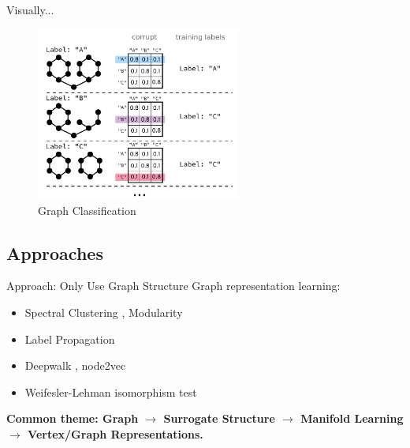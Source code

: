 \documentclass{beamer}
\begin{document}
    \begin{frame}{Visually...}
        \begin{figure}
            \centering
            \includegraphics[width=0.6\textwidth]{imgs/scheme}
            \caption{Graph Classification~\cite{my_lld2019}}
            \label{fig:lld2019}
        \end{figure}
    \end{frame}

    \subsection{Approaches}

    \begin{frame}{Approach: Only Use Graph Structure}
        Graph representation learning:
        \pause
        \begin{itemize}
            \item Spectral Clustering \cite{specs}, Modularity \cite{mod}
            \pause
            \item Label Propagation \cite{lp}
            \pause
            \item Deepwalk \cite{dw}, node2vec \cite{nv} 
            \pause
            \item Weifesler-Lehman isomorphism test
        \end{itemize}
        \pause
        \vspace{1em }
        \bf{Common theme}: Graph \pause$\rightarrow$ Surrogate Structure \pause$\rightarrow$ Manifold Learning \pause$\rightarrow$ Vertex/Graph Representations.
    \end{frame}
\end{document}
